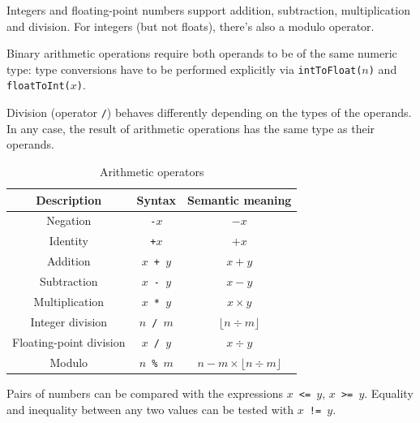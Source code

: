 \documentclass[UdineBachThesis,american,11pt]{PhdThesis}
\begin{document}
  \pagebreak

  Integers and floating-point numbers support addition, subtraction,
  multiplication and division. For integers (but not floats), there's also a
  modulo operator.

  Binary arithmetic operations require both operands to be of the same numeric
  type: type conversions have to be performed explicitly via
  \mbox{\texttt{intToFloat($n$)}} and \mbox{\texttt{floatToInt($x$)}}.

  Division (operator \texttt{/}) behaves differently depending on the types of
  the operands. In any case, the result of arithmetic operations has the same
  type as their operands.

  \begin{table}[H]
    \centering

    \begin{tabular}{|c|c|c|}
      \hline

      Description &
      Syntax &
      Semantic meaning \\
      \hline

      Negation &
      \texttt{-$x$} &
      $-x$ \\

      Identity &
      \texttt{+$x$} &
      $+x$ \\

      Addition &
      \texttt{$x$ + $y$} &
      $x + y$ \\

      Subtraction &
      \texttt{$x$ - $y$} &
      $x - y$ \\

      Multiplication &
      \texttt{$x$ * $y$} &
      $x \times y$ \\

      Integer division &
      \texttt{$n$ / $m$} &
      $\lfloor n \div m \rfloor$ \\

      Floating-point division &
      \texttt{$x$ / $y$} &
      $x \div y$ \\

      Modulo &
      \texttt{$n$ \% $m$} &
      $n - m \times \lfloor n \div m \rfloor$ \\
      \hline
    \end{tabular}

    \caption{Arithmetic operators}
  \end{table}

  Pairs of numbers can be compared with the expressions
  \mbox{\texttt{$x$ <= $y$}}, \mbox{\texttt{$x$ >= $y$}}. Equality and
  inequality between any two values can be tested with
  \mbox{\texttt{$x$ != $y$}}.
\end{document}
